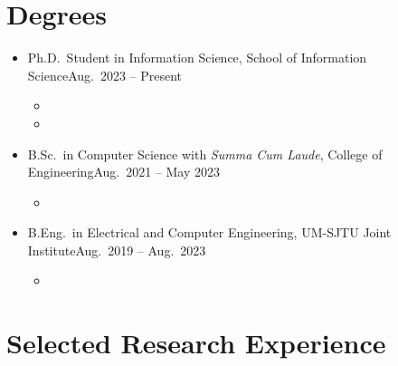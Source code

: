 \documentclass[letterpaper,10.8pt]{article}
\begin{document}
\head%

\section{Degrees}

\begin{itemize}
      \item {}
            {Ph.D.\ Student in Information Science, School of Information Science}{Aug.\ 2023 -- Present}
            \begin{itemize}
                  \item {}
                  \item {}
            \end{itemize}

      \item {}
            {B.Sc.\ in Computer Science with \emph{Summa Cum Laude}, College of Engineering}{Aug.\ 2021 -- May 2023}
            \begin{itemize}
                  \item {}
            \end{itemize}

      \item {}
            {B.Eng.\ in Electrical and Computer Engineering, UM-SJTU Joint Institute}{Aug.\ 2019 -- Aug.\ 2023}
            \begin{itemize}
                  \item {}
            \end{itemize}
\end{itemize}

\section{Selected Research Experience}
\end{document}
